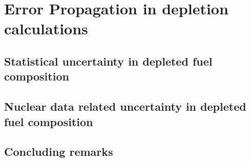 \chapter[Error Propagation in depletion 
calculations]{Error Propagation in depletion 
	calculations}

\section{Statistical uncertainty in depleted fuel composition}

\section{Nuclear data related uncertainty in depleted fuel composition}

\section{Concluding remarks}